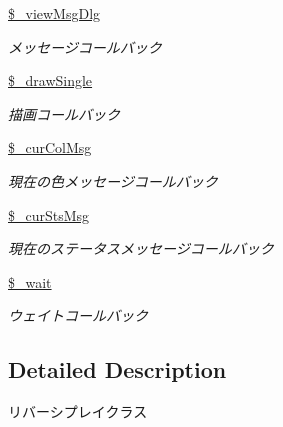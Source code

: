 \begin{DoxyCompactItemize}
\mbox{\label{class_reversi_play_a89b58366efdb0e2e7ca329281c97b99e}} 
\hyperlink{class_reversi_play_a89b58366efdb0e2e7ca329281c97b99e}{\$\+\_\+view\+Msg\+Dlg}
\begin{DoxyCompactList}\small\item\em メッセージコールバック \end{DoxyCompactList}\item 
\mbox{\label{class_reversi_play_a8899224fa79b2ad1a7b9565778dc2c10}} 
\hyperlink{class_reversi_play_a8899224fa79b2ad1a7b9565778dc2c10}{\$\+\_\+draw\+Single}
\begin{DoxyCompactList}\small\item\em 描画コールバック \end{DoxyCompactList}\item 
\mbox{\label{class_reversi_play_a6e19a53e6b12fbb372d789245c422ead}} 
\hyperlink{class_reversi_play_a6e19a53e6b12fbb372d789245c422ead}{\$\+\_\+cur\+Col\+Msg}
\begin{DoxyCompactList}\small\item\em 現在の色メッセージコールバック \end{DoxyCompactList}\item 
\mbox{\label{class_reversi_play_a213bf1223175cab6cd4794b7bff46e01}} 
\hyperlink{class_reversi_play_a213bf1223175cab6cd4794b7bff46e01}{\$\+\_\+cur\+Sts\+Msg}
\begin{DoxyCompactList}\small\item\em 現在のステータスメッセージコールバック \end{DoxyCompactList}\item 
\mbox{\label{class_reversi_play_aab934641dc936291a9c3c395eb6aa694}} 
\hyperlink{class_reversi_play_aab934641dc936291a9c3c395eb6aa694}{\$\+\_\+wait}
\begin{DoxyCompactList}\small\item\em ウェイトコールバック \end{DoxyCompactList}\end{DoxyCompactItemize}


\subsection{Detailed Description}
リバーシプレイクラス 

